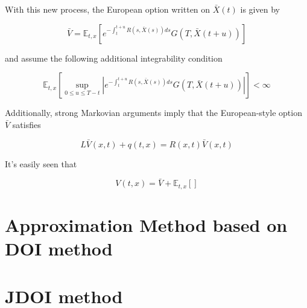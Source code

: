 With this new process, the European option written on $\bar{X}(t)$ is given by

\begin{equation}
    \bar{V} = \mathbb{E}_{t, x}\left[e^{-\int_t^{t+u} R(s,\bar{X}(s)) ds} G(T, \bar{X}(t+u))\right]
\end{equation}

\noindent and assume the following additional integrability condition

\begin{equation}
    \mathbb{E}_{t, x}\left[\sup _{0 \leq u \leq T-t}\left|e^{-\int_t^{t+u} R(s,\bar{X}(s)) ds} G(T, \bar{X}(t+u))\right|\right]<\infty
\end{equation}

Additionally, strong Markovian arguments imply that the European-style option $\bar{V}$ satisfies

\begin{equation}
    L\bar{V}(x,t) + q(t,x) = R(x,t)\bar{V}(x,t)
\end{equation}

It's easily seen that

\begin{equation}
    V(t,x) = \bar{V} + \mathbb{E}_{t,x}\left[\right]
\end{equation}

\section{Approximation Method based on DOI method}
\label{sec: 2.2}

\section{JDOI method}
\label{sec: 2.3}
  
\normalsize 


